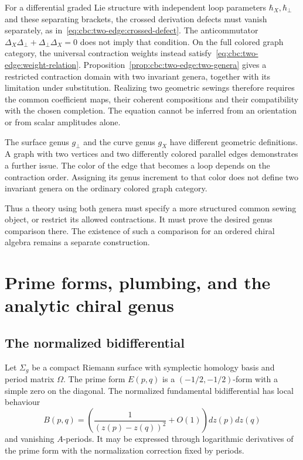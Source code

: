 For a differential graded Lie structure with independent loop parameters $\hbar_X,\hbar_\perp$ and these separating brackets, the crossed derivation defects must vanish separately, as in~\eqref{eq:cbc:two-edge:crossed-defect}.
The anticommutator $\Delta_X\Delta_\perp+\Delta_\perp\Delta_X=0$ does not imply that condition.
On the full colored graph category, the universal contraction weights instead satisfy~\eqref{eq:cbc:two-edge:weight-relation}.
Proposition~\ref{prop:cbc:two-edge:two-genera} gives a restricted contraction domain with two invariant genera, together with its limitation under substitution.
Realizing two geometric sewings therefore requires the common coefficient maps, their coherent compositions and their compatibility with the chosen completion.
The equation cannot be inferred from an orientation or from scalar amplitudes alone.

\begin{remark}
The surface genus $g_\perp$ and the curve genus $g_X$ have different geometric definitions.
A graph with two vertices and two differently colored parallel edges demonstrates a further issue.
The color of the edge that becomes a loop depends on the contraction order.
Assigning its genus increment to that color does not define two invariant genera on the ordinary colored graph category.

Thus a theory using both genera must specify a more structured common sewing object, or restrict its allowed contractions.
It must prove the desired genus comparison there.
The existence of such a comparison for an ordered chiral algebra remains a separate construction.
\end{remark}

\chapter{Prime forms, plumbing, and the analytic chiral genus}\label{chap:higher-genus}

\section{The normalized bidifferential}
Let \(\Sigma_g\) be a compact Riemann surface with symplectic homology basis and period matrix \(\Omega\).  The prime form \(E(p,q)\) is a \((-1/2,-1/2)\)-form with a simple zero on the diagonal.  The normalized fundamental bidifferential has local behaviour
\[
 B(p,q)=\left(\frac{1}{(z(p)-z(q))^2}+O(1)\right)dz(p)dz(q)
\]
and vanishing \(A\)-periods.  It may be expressed through logarithmic derivatives of the prime form with the normalization correction fixed by periods.

